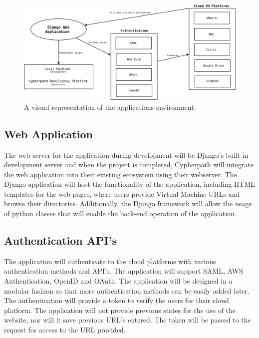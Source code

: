 \documentclass{article}
\begin{document}
    \begin{figure}[h]
    \includegraphics[scale=.4]{downloader_env}
        \caption{A visual representation of the applications environment.}
    \end{figure}


        \subsection{Web Application}
        The web server for the application during development will be Django's built in development server and when the project is completed, Cypherpath will integrate
        the web application into their existing ecosystem using their webserver. The Django application will host the functionality of the application, including HTML templates for the 
        web pages, where users provide Virtual Machine URLs and browse their directories. Additionally, the Django framework will allow the usage of python classes that will enable the 
        back-end operation of the application.

        
        \subsection{Authentication API's}
        The application will authenticate to the cloud platforms with various authentication methods and API's. The application will support
        SAML, AWS Authentication, OpenID and OAuth. The application will be designed in a modular fashion so that more authentication methods can be easily added later.
        The authentication will provide a token to verify the users for their cloud platform. The application will not provide previous states for the use of the 
        website, nor will it save previous URL's entered. The token will be passed to the request for access to the URL provided.
\end{document}
